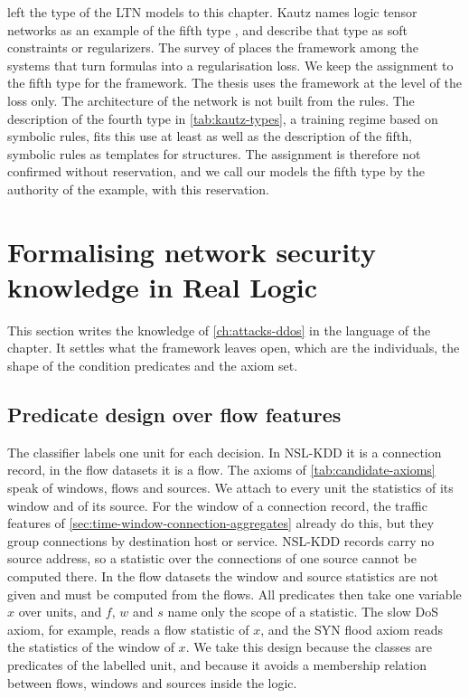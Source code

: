  left the type of the LTN models to this chapter.
Kautz names logic tensor networks as an example of the fifth type
\citep{kautz2022third}, and \citet{wan2024cognitive} describe that type as soft
constraints or regularizers. The survey of \citet{marra2024statistical} places
the framework among the systems that turn formulas into a regularisation loss.
We keep the assignment to the fifth type for the framework. The thesis uses
the framework at the level of the loss only. The architecture of the network
is not built from the rules. The description of the fourth type in
\cref{tab:kautz-types}, a training regime based on symbolic rules, fits this
use at least as well as the description of the fifth, symbolic rules as
templates for structures. The assignment is therefore not confirmed without
reservation, and we call our models the fifth type by the authority of the
example, with this reservation.

\section{Formalising network security knowledge in Real Logic}
\label{sec:formalising-security-knowledge}

This section writes the knowledge of \cref{ch:attacks-ddos} in the language
of the chapter. It settles what the framework leaves open, which are the
individuals, the shape of the condition predicates and the axiom set.

\subsection{Predicate design over flow features}
\label{sec:predicate-design}

The classifier labels one unit for each decision. In NSL-KDD it is a
connection record, in the flow datasets it is a flow. The axioms of
\cref{tab:candidate-axioms} speak of windows, flows and sources. We attach
to every unit the statistics of its window and of its source. For the window
of a connection record, the traffic features of
\cref{sec:time-window-connection-aggregates} already do this, but they group
connections by destination host or service. NSL-KDD records carry no source
address, so a statistic over the connections of one source cannot be
computed there. In the flow datasets the window and source statistics are
not given and must be computed from the flows. All predicates then take one variable $x$ over
units, and $f$, $w$ and $s$ name only the scope of a statistic. The slow DoS
axiom, for example, reads a flow statistic of $x$, and the SYN flood axiom
reads the statistics of the window of $x$. We take this design because the
classes are predicates of the labelled unit, and because it avoids a
membership relation between flows, windows and sources inside the logic.

